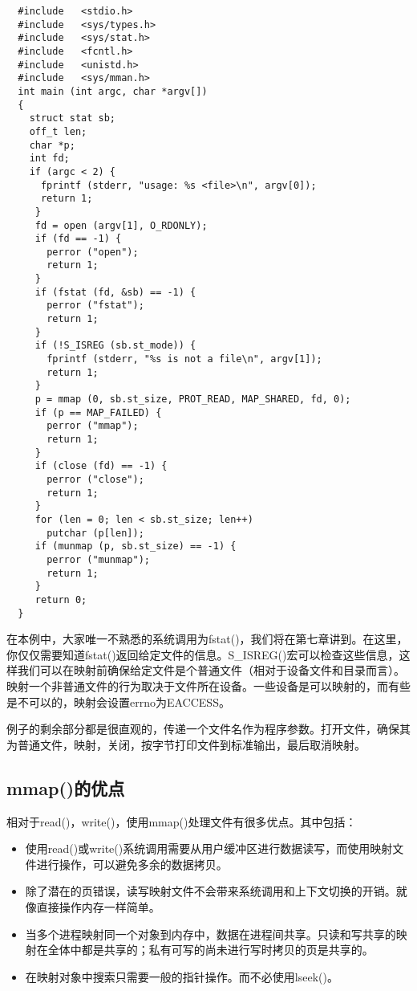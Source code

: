 \begin{lstlisting}
  #include   <stdio.h>
  #include   <sys/types.h>
  #include   <sys/stat.h>
  #include   <fcntl.h>
  #include   <unistd.h>
  #include   <sys/mman.h>
  int main (int argc, char *argv[])
  {
    struct stat sb;
    off_t len;
    char *p;
    int fd;
    if (argc < 2) {
      fprintf (stderr, "usage: %s <file>\n", argv[0]);
      return 1;
     }
     fd = open (argv[1], O_RDONLY);
     if (fd == -1) {
       perror ("open");
       return 1;
     }
     if (fstat (fd, &sb) == -1) {
       perror ("fstat");
       return 1;           
     }
     if (!S_ISREG (sb.st_mode)) {
       fprintf (stderr, "%s is not a file\n", argv[1]);
       return 1;
     }
     p = mmap (0, sb.st_size, PROT_READ, MAP_SHARED, fd, 0);
     if (p == MAP_FAILED) {
       perror ("mmap");
       return 1;
     }
     if (close (fd) == -1) {
       perror ("close");
       return 1;
     }
     for (len = 0; len < sb.st_size; len++)
       putchar (p[len]);
     if (munmap (p, sb.st_size) == -1) {
       perror ("munmap");
       return 1;
     }
     return 0;
  }
\end{lstlisting}

在本例中，大家唯一不熟悉的系统调用为fstat()，我们将在第七章讲到。在这里，你仅仅需要知道fstat()返回给定文件的信息。S\_ISREG()宏可以检查这些信息，这样我们可以在映射前确保给定文件是个普通文件（相对于设备文件和目录而言）。映射一个非普通文件的行为取决于文件所在设备。一些设备是可以映射的，而有些是不可以的，映射会设置errno为EACCESS。

例子的剩余部分都是很直观的，传递一个文件名作为程序参数。打开文件，确保其为普通文件，映射，关闭，按字节打印文件到标准输出，最后取消映射。

\subsection{mmap()的优点}

相对于read()，write()，使用mmap()处理文件有很多优点。其中包括：

\begin{itemize}
\item 使用read()或write()系统调用需要从用户缓冲区进行数据读写，而使用映射文件进行操作，可以避免多余的数据拷贝。
\item 除了潜在的页错误，读写映射文件不会带来系统调用和上下文切换的开销。就像直接操作内存一样简单。
\item 当多个进程映射同一个对象到内存中，数据在进程间共享。只读和写共享的映射在全体中都是共享的；私有可写的尚未进行写时拷贝的页是共享的。
\item 在映射对象中搜索只需要一般的指针操作。而不必使用lseek()。
\end{itemize}

